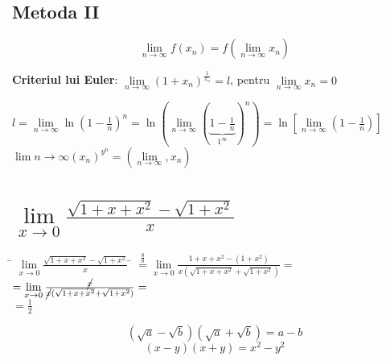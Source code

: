 \documentclass[a4paper, 12pt, notitlepage]{book}
\begin{document}
    \subsection{Metoda II}
        \[ \lim\limits_{n\to\infty}f(x_{n})=f(\lim\limits_{n\to\infty}x_{n}) \]%
        \begin{center}
          \textbf{Criteriul lui Euler}:
          $\lim\limits_{n \to \infty}{(1+x_{n})}^{\frac{1}{x_{n}}} = l$, pentru $\lim\limits_{n \to \infty} x_{n}=0$\\[5pt]
        \end{center}
        $l = \lim\limits_{n\to\infty}\ln{(1-\frac{1}{n})}^{n} = \ln(\lim\limits_{n\to\infty}{(\underbrace{1-\frac{1}{n}}_{1^{\infty}})}^{n}) = \ln [ \lim\limits_{n\to\infty}(1-\frac{1}{n}) ] $\\[5pt]
        $\lim{n\to\infty} {(x_{n})}^{y^{n}} = (\lim\limits_{n\to\infty}, x_{n})$

    \section{$\lim\limits_{x \to 0}\frac{\sqrt{1+x+x^{2}}-\sqrt{1+x^{2}}}{x}$}
    \begin{tabbing}
      \= $\lim\limits_{x \to 0}\frac{\sqrt{1+x+x^{2}}-\sqrt{1+x^{2}}}{x}$ \= $\stackrel{\frac{0}{0}}{=} \lim\limits_{x \to 0}\frac{1+x+x^{2}- (1+x^{2})}{x (\sqrt{1+x+x^{2}} + \sqrt{1+x^{2}})}=$\\[2pt]
      \>    \> $= \lim\limits_{x \to 0} \frac{\cancel{x}}{\cancel{x} (\sqrt{1+x+x^{2}} + \sqrt{1+x^{2}})} =$\\[2pt]
      \>    \> $= \frac{1}{2}$%
    \end{tabbing}
    \[ (\sqrt{a} - \sqrt{b}) (\sqrt{a} + \sqrt{b}) = a - b \]
    \[ (x - y) (x + y) = x^{2} - y^{2} \]
\end{document}
